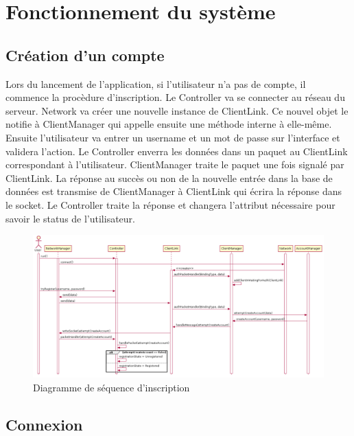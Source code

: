 \documentclass{article}
\begin{document}
\newpage

\section{Fonctionnement du système}

\subsection{Création d'un compte}

Lors du lancement de l'application, si l'utilisateur n'a pas de compte, il commence la procèdure d'inscription. Le Controller va se connecter au réseau du serveur. Network va créer une nouvelle instance de ClientLink. Ce nouvel objet le notifie à ClientManager qui appelle ensuite une méthode interne à elle-même. Ensuite l'utilisateur va entrer un username et un mot de passe sur l'interface et validera l'action. Le Controller enverra les données dans un paquet au ClientLink correspondant à l'utilisateur. ClientManager traite le paquet une fois signalé par ClientLink. La réponse au succès ou non de la nouvelle entrée dans la base de données est transmise de ClientManager à ClientLink qui écrira la réponse dans le socket. Le Controller traite la réponse et changera l'attribut nécessaire pour savoir le status de l'utilisateur.

\begin{figure}[H]
    \centering
    \includegraphics[width=1\textwidth]{../res/uml/sequence/InscriptionSequence.png}
    \caption{Diagramme de séquence d'inscription}
    \label{fig:InscriptionDiagram}
\end{figure}

\subsection{Connexion}
\end{document}
